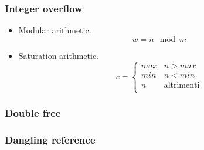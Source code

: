 \documentclass{beamer}
\begin{document}
\begin{frame}
    \frametitle{Integer overflow}
    \begin{itemize}
        \item Modular arithmetic. \[ w = n \mod m \]
        \item Saturation arithmetic. 
        \[ 
            c = \begin{cases}
            max & n > max \\
            min & n < min \\
            n  & \text{altrimenti} \\
        \end{cases} 
        \]
    \end{itemize}
\end{frame}



\begin{frame}
    \frametitle{Double free}
    
    
\end{frame}

    

\begin{frame}
    \frametitle{Dangling reference}
    
    
\end{frame}
\end{document}
